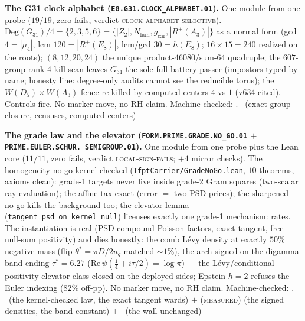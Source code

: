 \documentclass[11pt,a4paper]{article}
\newcommand{\gcar}{g_{\mathrm{car}}}
\newcommand{\Nfam}{N_{\mathrm{fam}}}
\theoremstyle{definition}
\begin{document}
\par\smallskip\noindent\textbf{The G31 clock alphabet
(\texttt{E8.G31.\allowbreak CLOCK\_ALPHABET.01}).}
One module from one probe ($19/19$, zero fails, verdict
\textsc{clock-alphabet-selective}).
$\mathrm{Deg}(G_{31})/4 = \{2,3,5,6\} = \{|Z_2|, \Nfam, \gcar,
|R^+(A_3)|\}$ as a normal form (gcd $4 = |\mu_4|$, lcm $120 =
|R^+(E_8)|$, lcm/gcd $30 = h(E_8)$; $16 \times 15 = 240$
realized on the roots); $(8,12,20,24)$ the unique
product-$46080$/sum-$64$ quadruple; the $607$-group rank-4 kill
scan leaves $G_{31}$ the sole full-battery passer (impostors
typed by name; honesty line: degree-only audits cannot see the
reducible torus); the $W(D_5)\times W(A_3)$ fence re-killed by
computed centers $4$ vs $1$ (v634 cited).  Controls fire.  No
marker move, no RH claim.
Machine-checked: .
\mE\ (exact group closure, censuses, computed centers)
\par\smallskip

\par\smallskip\noindent\textbf{The grade law and the elevator
(\texttt{FORM.PRIME.\allowbreak GRADE.\allowbreak NO\_GO.01}
$+$ \texttt{PRIME.EULER.\allowbreak SCHUR.\allowbreak
SEMIGROUP.01}).}
One module from one probe plus the Lean core ($11/11$, zero
fails, verdict \textsc{local-sign-fails}; $+4$ mirror checks).
The homogeneity no-go kernel-checked
(\texttt{TfptCarrier/GradeNoGo.lean}, $10$ theorems, axioms
clean): grade-1 targets never live inside grade-2 Gram squares
(two-scalar ray evaluation); the affine tax exact
(error $=$ two PSD prices); the sharpened no-go kills the
background too; the elevator lemma
(\texttt{tangent\_psd\_on\_kernel\_null}) licenses exactly one
grade-1 mechanism: rates.  The instantiation is real (PSD
compound-Poisson factors, exact tangent, free null-sum
positivity) and dies honestly: the comb L\'evy density at
exactly $50\%$ negative mass (flip $\theta^* = \pi D/2u_q$
matched ${\sim}1\%$), the arch signed on the digamma band
ending $\tau^* = 6.27$ ($\mathrm{Re}\,\psi(\tfrac14 + i\tau/2)
= \log\pi$) --- the L\'evy/conditional-positivity elevator
class closed on the deployed sides; Epstein $h{=}2$ refuses the
Euler indexing ($82\%$ off-pp).  No marker move, no RH claim.
Machine-checked: .
\mE\ (the kernel-checked law, the exact tangent wards) $+$
(\textsc{measured}) (the signed densities, the band constant)
$+$ \mO\ (the wall unchanged)
\par\smallskip
\end{document}
